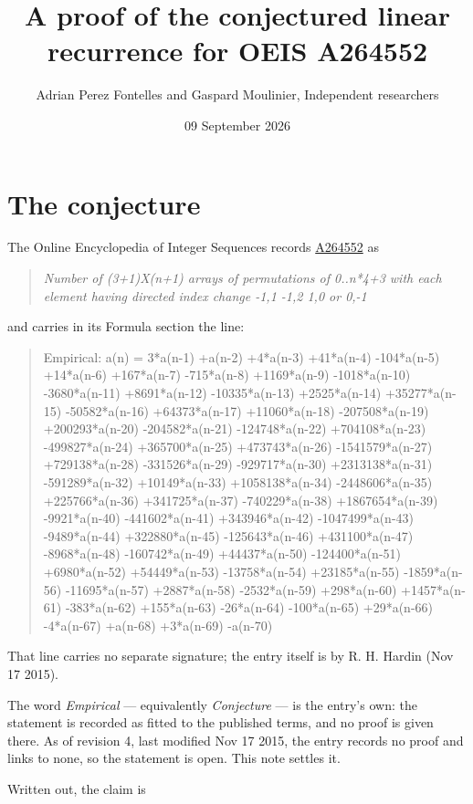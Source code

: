 \documentclass[11pt]{article}
\title{A proof of the conjectured linear recurrence for OEIS A264552}
\author{Adrian Perez Fontelles and Gaspard Moulinier, Independent researchers}
\date{09 September 2026}
\theoremstyle{definition}
\begin{document}
\maketitle
\section{The conjecture}

The Online Encyclopedia of Integer Sequences records \href{https://oeis.org/A264552}{A264552} as

\begin{quote}\itshape Number of (3+1)X(n+1) arrays of permutations of 0..n*4+3 with each element having directed index change -1,1 -1,2 1,0 or 0,-1\end{quote}

and carries in its Formula section the line:

\begin{quote}\ttfamily Empirical: a(n) = 3*a(n-1) +a(n-2) +4*a(n-3) +41*a(n-4) -104*a(n-5) +14*a(n-6) +167*a(n-7) -715*a(n-8) +1169*a(n-9) -1018*a(n-10) -3680*a(n-11) +8691*a(n-12) -10335*a(n-13) +2525*a(n-14) +35277*a(n-15) -50582*a(n-16) +64373*a(n-17) +11060*a(n-18) -207508*a(n-19) +200293*a(n-20) -204582*a(n-21) -124748*a(n-22) +704108*a(n-23) -499827*a(n-24) +365700*a(n-25) +473743*a(n-26) -1541579*a(n-27) +729138*a(n-28) -331526*a(n-29) -929717*a(n-30) +2313138*a(n-31) -591289*a(n-32) +10149*a(n-33) +1058138*a(n-34) -2448606*a(n-35) +225766*a(n-36) +341725*a(n-37) -740229*a(n-38) +1867654*a(n-39) -9921*a(n-40) -441602*a(n-41) +343946*a(n-42) -1047499*a(n-43) -9489*a(n-44) +322880*a(n-45) -125643*a(n-46) +431100*a(n-47) -8968*a(n-48) -160742*a(n-49) +44437*a(n-50) -124400*a(n-51) +6980*a(n-52) +54449*a(n-53) -13758*a(n-54) +23185*a(n-55) -1859*a(n-56) -11695*a(n-57) +2887*a(n-58) -2532*a(n-59) +298*a(n-60) +1457*a(n-61) -383*a(n-62) +155*a(n-63) -26*a(n-64) -100*a(n-65) +29*a(n-66) -4*a(n-67) +a(n-68) +3*a(n-69) -a(n-70)\end{quote}

That line carries no separate signature; the entry itself is by R. H. Hardin (Nov 17 2015).

The word {\itshape Empirical} --- equivalently {\itshape Conjecture} --- is the entry's own: the statement is recorded as fitted to the published terms, and no proof is given there. As of revision 4, last modified Nov 17 2015, the entry records no proof and links to none, so the statement is open. This note settles it.

Written out, the claim is
\end{document}
